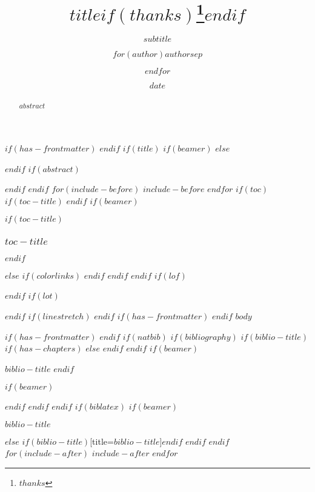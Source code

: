 \documentclass[
$if(fontsize)$
  $fontsize$,
$endif$
$if(lang)$
  $babel-lang$,
$endif$
$if(papersize)$
  $papersize$paper,
$endif$
$if(beamer)$
  ignorenonframetext,
  $if(handout)$
    handout,
  $endif$
  $if(aspectratio)$
    aspectratio=$aspectratio$,
  $endif$
$endif$
$for(classoption)$
  $classoption$$sep$,
$endfor$
]{$documentclass$}
\title{$title$$if(thanks)$\thanks{$thanks$}$endif$}
\subtitle{$subtitle$}
\author{$for(author)$$author$$sep$ \and $endfor$}
\date{$date$}
\institute{$for(institute)$$institute$$sep$ \and $endfor$}
\newif\ifbibliography
\begin{document}
$if(has-frontmatter)$
  \frontmatter
$endif$
$if(title)$
  $if(beamer)$
    \frame{\titlepage}
  $else$
    \maketitle
  $endif$
  $if(abstract)$
  \begin{abstract}
    $abstract$
  \end{abstract}
  $endif$
$endif$
$for(include-before)$
  $include-before$
$endfor$
$if(toc)$
  $if(toc-title)$
    \renewcommand*\contentsname{$toc-title$}
  $endif$
  $if(beamer)$
  \begin{frame}[allowframebreaks]
    $if(toc-title)$
      \frametitle{$toc-title$}
    $endif$
    \tableofcontents[hideallsubsections]
  \end{frame}
  $else$
  {
    $if(colorlinks)$
      \hypersetup{linkcolor=$if(toccolor)$$toccolor$$else$$endif$}
    $endif$
    \setcounter{tocdepth}{$toc-depth$}
    \tableofcontents
  }
  $endif$
$endif$
\newpage
$if(lof)$
  \listoffigures
$endif$
\newpage
$if(lot)$
  \listoftables
$endif$
\newpage
$if(linestretch)$
$endif$
$if(has-frontmatter)$
  \mainmatter
$endif$
$body$

$if(has-frontmatter)$
  \backmatter
$endif$
$if(natbib)$
  $if(bibliography)$
    $if(biblio-title)$
      $if(has-chapters)$
        \renewcommand\bibname{$biblio-title$}
      $else$
        \renewcommand\refname{$biblio-title$}
      $endif$
    $endif$
    $if(beamer)$
      \begin{frame}[allowframebreaks]{$biblio-title$}
      \bibliographytrue
    $endif$
    
    $if(beamer)$
      \end{frame}
    $endif$
  $endif$
$endif$
$if(biblatex)$
  $if(beamer)$
    \begin{frame}[allowframebreaks]{$biblio-title$}
    \bibliographytrue
    \printbibliography[heading=none]
    \end{frame}
  $else$
  \printbibliography$if(biblio-title)$[title=$biblio-title$]$endif$
  $endif$
$endif$
$for(include-after)$
  $include-after$
$endfor$
\end{document}
